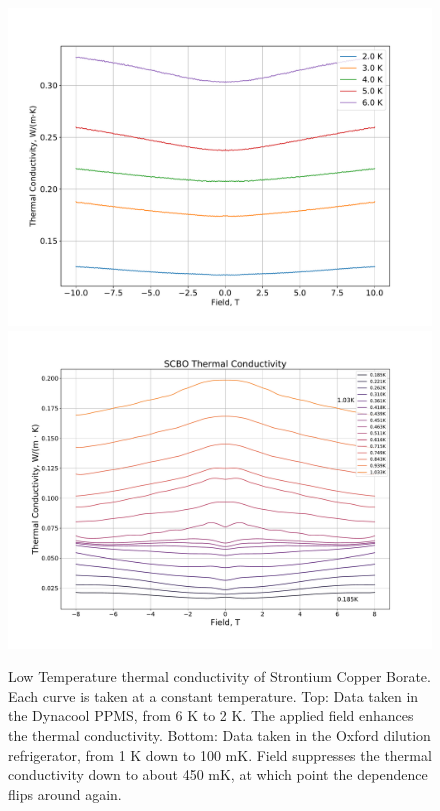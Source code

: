 \documentclass{thesis-umich}
\begin{document}
\begin{figure}
	\centering
	\caption[Low Temperature Thermal Conductivity of SCBO]{Low Temperature thermal conductivity of Strontium Copper Borate. Each curve is taken at a constant temperature. Top: Data taken in the Dynacool PPMS, from 6 K to 2 K. The applied field enhances the thermal conductivity. Bottom: Data taken in the Oxford dilution refrigerator, from 1 K down to 100 mK. Field suppresses the thermal conductivity down to about 450 mK, at which point the dependence flips around again.}
	\label{fig:SCBO_kappa_xx}
	\includegraphics[width=0.9\columnwidth,trim={1cm 1cm 1cm 1cm},clip]{figures/SCBO_tcond_high.pdf}
	\includegraphics[width=0.9\columnwidth,trim={1cm 1cm 1cm 1cm},clip]{figures/SCBO_kappa_xx_vs_B_1.pdf}
\end{figure}
\end{document}

